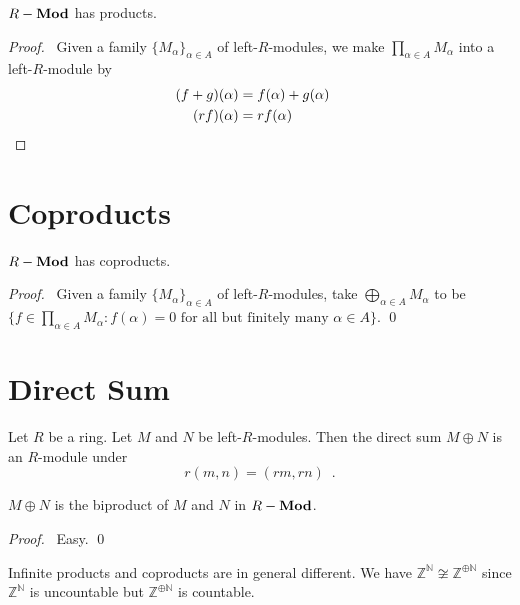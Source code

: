 \begin{prop}
$\Mod{R}$ has products.
\end{prop}

\begin{proof}
\pf\ Given a family $\{ M_\alpha \}_{\alpha \in A}$ of left-$R$-modules, we make $\prod_{\alpha \in A} M_\alpha$ into a left-$R$-module by
\begin{align*}
(f + g)(\alpha) & = f(\alpha) + g(\alpha) \\
(rf)(\alpha) & = rf(\alpha) & \qed
\end{align*}
\end{proof}

\section{Coproducts}

\begin{prop}
$\Mod{R}$ has coproducts.
\end{prop}

\begin{proof}
\pf\ Given a family $\{M_\alpha \}_{\alpha \in A}$ of left-$R$-modules, take $\bigoplus_{\alpha \in A} M_\alpha$ to be $\{ f \in \prod_{\alpha \in A} M_\alpha : f(\alpha) = 0 \text{ for all but finitely many } \alpha \in A \}$. \qed
\end{proof}

\section{Direct Sum}

\begin{df}
Let $R$ be a ring. Let $M$ and $N$ be left-$R$-modules. Then the direct sum $M \oplus N$ is an $R$-module under
\[ r(m,n) = (rm,rn) \enspace . \]
\end{df}

\begin{prop}
$M \oplus N$ is the biproduct of $M$ and $N$ in $\Mod{R}$.
\end{prop}

\begin{proof}
\pf\ Easy. \qed
\end{proof}

\begin{ex}
Infinite products and coproducts are in general different. We have $\mathbb{Z}^{\mathbb{N}} \not\cong \mathbb{Z}^{\oplus \mathbb{N}}$ since $\mathbb{Z}^{\mathbb{N}}$ is uncountable but $\mathbb{Z}^{\oplus \mathbb{N}}$ is countable.
\end{ex}

